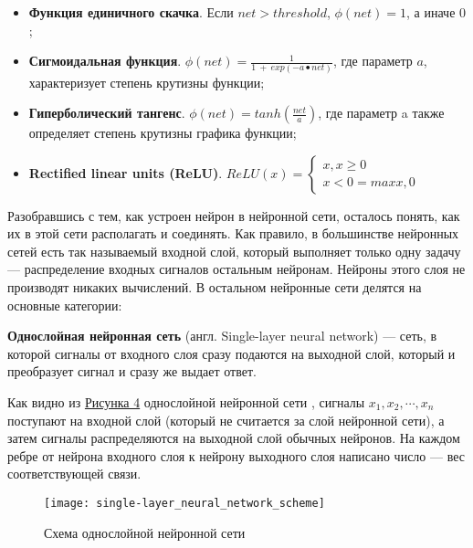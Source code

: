     \begin{itemize}
        \item \textbf{Функция единичного скачка}.
            Если $net > threshold$, $\phi(net) = 1$, а иначе $0$;
        \item \textbf{Сигмоидальная функция}.
            $\phi(net) = \frac{1}{1\ +\ exp(-a\bullet n e t)}$, где параметр $a$, характеризует степень крутизны функции;
        \item \textbf{Гиперболический тангенс}.
            $\phi(net) = tanh(\frac{net}{a})$, где параметр a также определяет степень крутизны графика функции;
        \item \textbf{Rectified linear units (ReLU)}.
            $
                ReLU(x) =
                \begin{cases}
                    x, x \geq 0 \\
                    x < 0 = maxx, 0
                \end{cases}
            $
    \end{itemize}
    
    Разобравшись с тем, как устроен нейрон в нейронной сети, осталось понять, как их в этой сети располагать и соединять. Как правило, в большинстве нейронных сетей есть так называемый входной слой, который выполняет только одну задачу — распределение входных сигналов остальным нейронам. Нейроны этого слоя не производят никаких вычислений. В остальном нейронные сети делятся на основные категории:

    \textbf{Однослойная нейронная сеть} (англ. Single-layer neural network) — сеть, в которой сигналы от входного слоя сразу подаются на выходной слой, который и преобразует сигнал и сразу же выдает ответ.

    Как видно из \hyperref[fig:single-layer_neural_network_scheme]{Рисунка 4} однослойной нейронной сети , сигналы $x_1,x_2,\cdots,x_n$ поступают на входной слой (который не считается за слой нейронной сети), а затем сигналы распределяются на выходной слой обычных нейронов. На каждом ребре от нейрона входного слоя к нейрону выходного слоя написано число — вес соответствующей связи.

     \begin{figure}[ht]
        \centering
        \texttt{[image: single-layer\_neural\_network\_scheme]}
        \caption{Схема однослойной нейронной сети}
        \label{fig:single-layer_neural_network_scheme}
    \end{figure}

